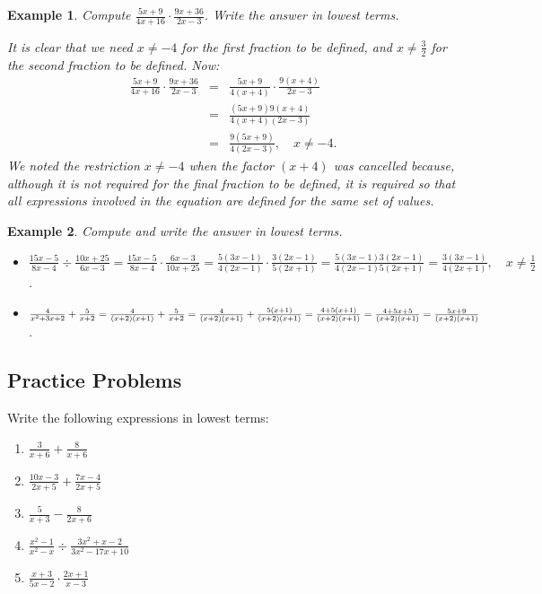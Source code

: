 \documentclass[11pt]{book}               %
\newtheorem{example}{Example}
\begin{document}
\begin{example}
Compute  $ \frac{5x+9}{4x+16} \cdot \frac{9x+36}{2x-3}$.  Write the answer in lowest terms.

\normalfont 
It is clear that we need $x \neq -4$ for the first fraction to
be defined, and $x \neq \frac{3}{2}$ for the second fraction to be defined.  Now:
\begin{eqnarray*}
\frac{5x+9}{4x+16} \cdot \frac{9x+36}{2x-3} &=& \frac{5x+9}{4(x+4)} \cdot \frac{9(x+4)}{2x-3} \\
    &=& \frac{(5x+9)9(x+4)}{4(x+4)(2x-3)} \\
    &=&  \frac{9(5x+9)}{ 4(2x-3)}, \quad x\neq -4.
\end{eqnarray*}
We noted the restriction $x \neq -4$ when the factor $(x+4)$ was cancelled because, although it is not required for the final fraction to be defined,
 it is required so that all expressions involved in the equation are defined for the same set of values.
\end{example}

\begin{example}
Compute and write the answer in lowest terms.
\begin{itemize}


\item $ \frac{15x-5}{8x-4} \div \frac{10x+25}{6x-3} 
    = \frac{15x-5}{8x-4}  \cdot \frac{6x-3}{10x+25} 
    = \frac{5(3x-1)}{4(2x-1)} \cdot \frac{3(2x-1)}{5(2x+1)} 
    = \frac{5(3x-1)3(2x-1)}{4(2x-1)5(2x+1)} 
    = \frac{3(3x-1)}{4(2x+1)},\quad x \neq \frac{1}{2} $.

\item $ \frac{4}{x^2+3x+2} + \frac{5}{x+2} 
    = \frac{4}{(x+2)(x+1)} + \frac{5}{x+2} 
    = \frac{4}{(x+2)(x+1)} + \frac{5(x+1)}{(x+2)(x+1)} 
    = \frac{4 +5(x+1)}{(x+2)(x+1)}  \\
    = \frac{4 +5x+5}{(x+2)(x+1)} 
    = \frac{5x+9}{(x+2)(x+1)}  $.
\end{itemize}
\end{example}


\subsection{Practice Problems}

Write the following expressions in lowest terms:
\begin{enumerate}
\item $ \frac{3}{x+6} + \frac{8}{x+6} $ 
\item $ \frac{10x-3}{2x+5} + \frac{7x-4}{2x+5} $ 
\item $ \frac{5}{x+3} - \frac{8}{2x+6} $  
\item $ \frac{x^2 -1}{x^2-x} \div \frac{3x^2 +x -2}{3x^2-17x+10}  $ 
\item $ \frac{x+3}{5x-2} \cdot \frac{2x+1}{x-3}   $ 
\end{enumerate}
\end{document}
